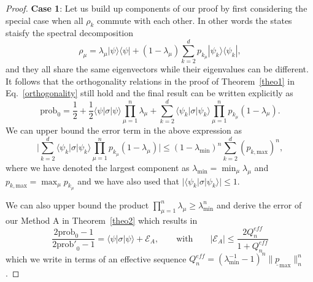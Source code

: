 \documentclass[aps,prx,showpacs,twocolumn,reprint]{revtex4-2}
\begin{document}
{\begin{proof}
	\textbf{Case 1}: Let us build up components of our proof by first considering the special case when all $\rho_k$
	commute with each other. In other words the states staisfy the spectral decomposition
	\begin{equation*}
	\rho_\mu =\lambda_\mu | \psi \rangle \langle \psi  |  + (1-\lambda_\mu) \sum_{k=2}^d p_{k_\mu} |\psi_{k}\rangle \langle \psi_{k} |,
	\end{equation*}
	and they all share the same eigenvectors while their eigenvalues can be different.
	It follows that the orthogonality relations in the proof of Theorem~\ref{theo1} in Eq.~\eqref{orthogonality} 
	still hold and the final result can be written explicitly as
	\begin{equation}
	\mathrm{prob}_0 =\frac{1}{2} + \frac{1}{2}  \langle \psi  | \sigma | \psi \rangle \prod_{\mu=1}^n \lambda_\mu
	+ \sum_{k=2}^d   \langle\psi_k |\sigma | \psi_k \rangle \prod_{\mu=1}^n p_{k_\mu} (1-\lambda_\mu).
	\end{equation}
	We can upper bound the error term in the above expression as
	\begin{equation}
	 \lvert \sum_{k=2}^d  \langle\psi_k |\sigma | \psi_k \rangle \prod_{\mu=1}^n p_{k_\mu} (1-\lambda_\mu) \rvert \leq
	  (1-\lambda_\mathrm{min})^n \sum_{k=2}^d  (p_{k,\mathrm{max}})^n,
	\end{equation}
	where we have denoted the largest component as $ \lambda_\mathrm{min} = \min_\mu \lambda_\mu $ and
	$ p_{k,\mathrm{max}} = \max_\mu p_{k_\mu}$ and we have also used that
	 $ \lvert \langle\psi_k |\sigma | \psi_k \rangle \rvert \leq 1$.
	
	We can also upper bound the product $\prod_{\mu=1}^n \lambda_\mu \geq \lambda_\mathrm{min}^n$
	and  derive the error of our Method A in Theorem~\ref{theo2}	which results in 
	\begin{equation*}
	\frac{2\mathrm{prob}_0-1}{2\mathrm{prob'}_0-1}
	=  \langle \psi  | \sigma | \psi \rangle  + \mathcal{E}_A,
	\quad \quad \text{with}	\quad \quad 
	|\mathcal{E}_A| \leq  \frac{2 Q_n^{eff}   }{1+  Q_n^{eff}   }
	\end{equation*}
	which we write in terms of an effective sequence
	$Q_n^{eff} = (\lambda_\mathrm{min}^{-1}{-}1)^n \lVert \underline{p}_\mathrm{max} \rVert_n^n$.
	

\end{proof}}
\end{document}
